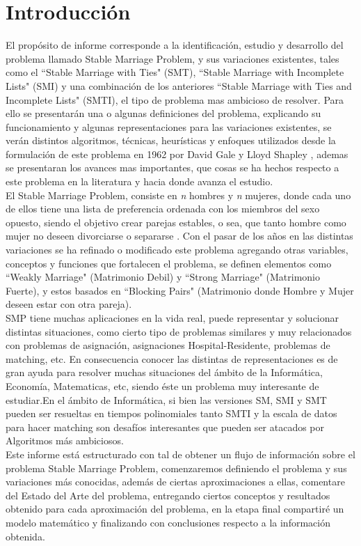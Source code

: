 \documentclass[letter, 10pt]{article}
\begin{document}
\section{Introducci\'on}

El prop\'osito de informe corresponde a la identificaci\'on, estudio y desarrollo del problema llamado Stable Marriage Problem, y sus variaciones 
existentes, tales como el ``Stable Marriage with Ties" (SMT), ``Stable Marriage with Incomplete Lists" (SMI) y una combinaci\'on de los anteriores
``Stable Marriage with Ties and Incomplete Lists" (SMTI), el tipo de problema mas ambicioso de resolver. 
Para ello se presentar\'an una o algunas definiciones del problema, explicando su funcionamiento y algunas representaciones para
las variaciones existentes, se ver\'an distintos algoritmos, t\'ecnicas, heur\'isticas y enfoques utilizados desde la formulaci\'on de este 
problema en 1962 por David Gale y Lloyd Shapley \cite{GaleShapley62}, ademas se presentaran los avances mas importantes, que cosas se ha hechos respecto
a este problema en la literatura y hacia donde avanza el estudio. \\

\indent El Stable Marriage Problem, consiste en \textit{n} hombres y \textit{n} mujeres, donde cada uno de ellos tiene una lista 
de preferencia ordenada con los miembros del sexo opuesto, siendo el objetivo crear parejas estables, o sea, que tanto hombre
como mujer no deseen divorciarse o separarse \cite{GaleShapley62}. Con el pasar de los a\~nos en las distintas variaciones
se ha refinado o modificado este problema agregando otras variables, conceptos y funciones que fortalecen el problema, se definen elementos como  
``Weakly Marriage" (Matrimonio Debil) y ``Strong Marriage" (Matrimonio Fuerte), y estos basados en ``Blocking Pairs" (Matrimonio donde Hombre
 y Mujer deseen estar con otra pareja).  \\ 
\indent SMP tiene muchas aplicaciones en la vida real, puede representar y solucionar distintas situaciones, como cierto tipo de problemas 
similares y muy relacionados con problemas de asignaci\'on, asignaciones Hospital-Residente, problemas de matching, etc. 
En consecuencia conocer las distintas de representaciones es de gran ayuda para resolver muchas situaciones del \'ambito 
de la Inform\'atica, Econom\'ia, Matematicas, etc,  siendo \'este un problema muy interesante de estudiar.\indent En el \'ambito de Inform\'atica,
 si bien las versiones SM, SMI y SMT pueden ser resueltas en tiempos polinomiales tanto SMTI y la escala de datos para hacer
 matching son desaf\'ios interesantes que pueden ser atacados por Algoritmos m\'as ambiciosos.\\ 
\indent	Este informe est\'a estructurado con tal de obtener un flujo de informaci\'on sobre el problema Stable Marriage Problem, comenzaremos definiendo el 
problema y sus variaciones m\'as conocidas, adem\'as de ciertas aproximaciones a ellas, comentare del Estado del Arte del problema, entregando ciertos 
conceptos y resultados obtenido para cada aproximaci\'on del problema, en la etapa final compartir\'e un modelo matem\'atico y finalizando con 
conclusiones respecto a la informaci\'on obtenida.    
\end{document}
